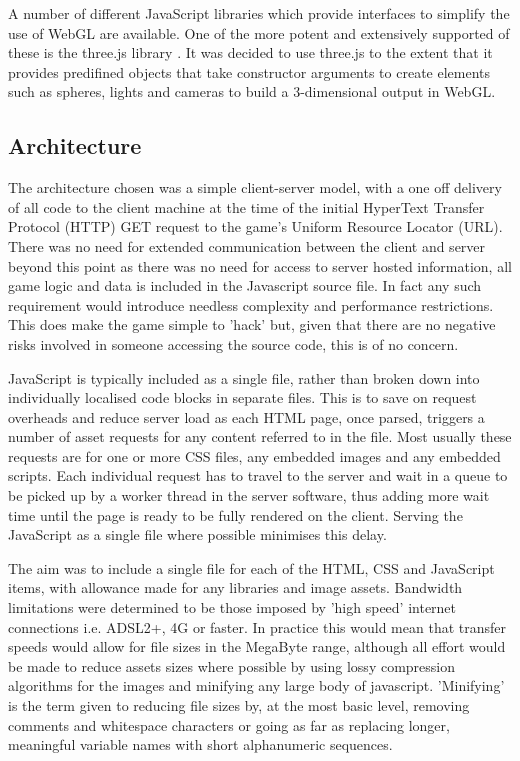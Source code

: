 \documentclass[twoside]{bhamthesis}
\begin{document}
A number of different JavaScript libraries which provide interfaces to simplify the use of WebGL are available. One of the more potent and extensively supported of these is the three.js library \cite{cabello_three.js_????}. It was decided to use three.js to the extent that it provides predifined objects that take constructor arguments to create elements such as spheres, lights and cameras to build a 3-dimensional output in WebGL.

\subsection{Architecture}

The architecture chosen was a simple client-server model, with a one off delivery of all code to the client machine at the time of the initial HyperText Transfer Protocol (HTTP) GET request to the game's Uniform Resource Locator (URL). There was no need for extended communication between the client and server beyond this point as there was no need for access to server hosted information, all game logic and data is included in the Javascript source file. In fact any such requirement would introduce needless complexity and performance restrictions. This does make the game simple to 'hack' but, given that there are no negative risks involved in someone accessing the source code, this is of no concern.

JavaScript is typically included as a single file, rather than broken down into individually localised code blocks in separate files. This is to save on request overheads and reduce server load as each HTML page, once parsed, triggers a number of asset requests for any content referred to in the file. Most usually these requests are for one or more CSS files, any embedded images and any embedded scripts. Each individual request has to travel to the server and wait in a queue to be picked up by a worker thread in the server software, thus adding more wait time until the page is ready to be fully rendered on the client. Serving the JavaScript as a single file where possible minimises this delay.

The aim was to include a single file for each of the HTML, CSS and JavaScript items, with allowance made for any libraries and image assets. Bandwidth limitations were determined to be those imposed by 'high speed' internet connections i.e. ADSL2+, 4G or faster. In practice this would mean that transfer speeds would allow for file sizes in the MegaByte range, although all effort would be made to reduce assets sizes where possible by using lossy compression algorithms for the images and minifying any large body of javascript. 'Minifying' is the term given to reducing file sizes by, at the most basic level, removing comments and whitespace characters or going as far as replacing longer, meaningful variable names with short alphanumeric sequences.
\end{document}
